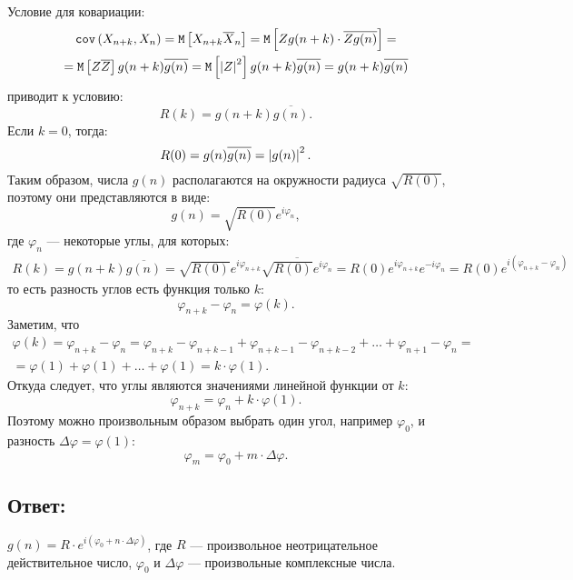 \documentclass[12pt]{article}
\begin{document}
    Условие для ковариации:
    \begin{multline*}
        \mathtt{cov} \left ( X_{n+k}, X_n \right )
        = \mathtt{M} \left [ X_{n+k} \overline{X}_n \right ]
        = \mathtt{M} \left [ Z g(n+k) \cdot \overline{Z g(n)} \right ] = \\
        = \mathtt{M} \left [ Z \overline{Z} \right ] g(n+k) \overline{g(n)}
        = \mathtt{M} \left [ \left | Z \right |^2 \right ] g(n+k) \overline{g(n)}
        = g(n+k) \overline{g(n)}
    \end{multline*}
    приводит к условию:
    \begin{equation}
        \label{13.8:covariance}
        R(k)
        = g(n+k) \overline{g(n)}.
    \end{equation}
    Если $k=0$, тогда:
    \[
        R(0)
        = g(n) \overline{g(n)}
        = \left | g(n) \right |^2.
    \]
    Таким образом, числа $g(n)$ располагаются на окружности радиуса $\sqrt{R(0)}$, поэтому они представляются в виде:
    \[
        g(n) = \sqrt{R(0)} e^{i \varphi_n},
    \]
    где $\varphi_n$ --- некоторые углы, для которых:
    \begin{gather*}
        R(k)
        = g(n+k) \overline{g(n)}
        = \sqrt{R(0)} e^{i \varphi_{n+k}} \overline{\sqrt{R(0)} e^{i \varphi_{n}}}
        = R(0) e^{i \varphi_{n+k}} e^{- i \varphi_{n}}
        = R(0) e^{i ( \varphi_{n+k} - \varphi_n )}
    \end{gather*}
    то есть разность углов есть функция только $k$:
    \[
        \varphi_{n+k} - \varphi_n = \varphi(k) .
    \]
    Заметим, что
    \begin{multline*}
        \varphi(k)
        = \varphi_{n+k} - \varphi_n
        = \varphi_{n+k} - \varphi_{n+k-1} + \varphi_{n+k-1} - \varphi_{n+k-2} + \dots + \varphi_{n+1} - \varphi_n = \\
        = \varphi(1) + \varphi(1) + \dots + \varphi(1)
        = k \cdot \varphi(1) .
    \end{multline*}
    Откуда следует, что углы являются значениями линейной функции от $k$:
    \[
        \varphi_{n+k} = \varphi_n + k \cdot \varphi(1).
    \]
    Поэтому можно произвольным образом выбрать один угол, например $\varphi_0$, и разность $\Delta \varphi = \varphi(1)$:
    \[
        \varphi_m = \varphi_0 + m \cdot \Delta \varphi .
    \]

    \subsection*{Ответ:}
    $g(n) = R \cdot e^{i ( \varphi_0 + n \cdot \Delta \varphi)}$, где $R$ --- произвольное неотрицательное действительное число, $\varphi_0$ и $\Delta \varphi$ ---
    произвольные комплексные числа.
\end{document}

